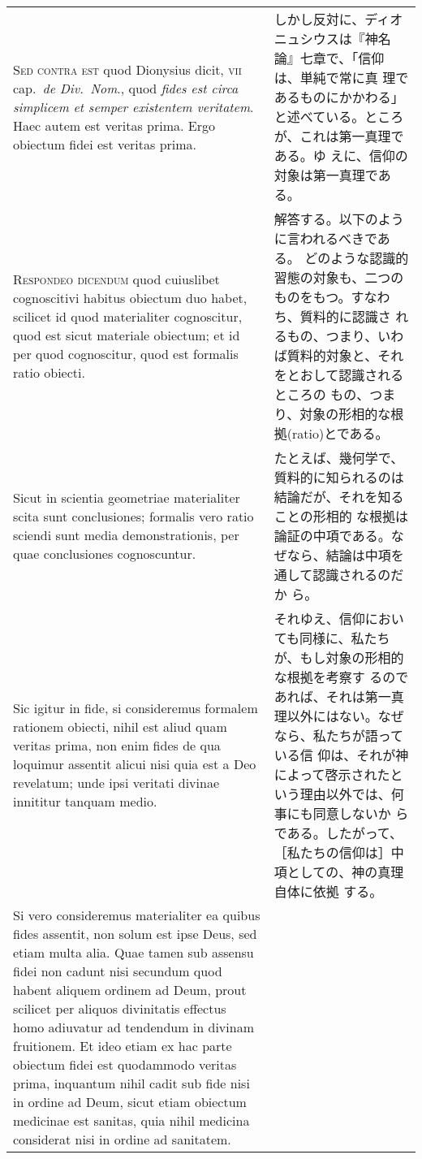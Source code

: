 \documentclass[10pt]{jsarticle} %
\begin{document}
\begin{longtable}{p{21em}p{21em}}
{\scshape Sed contra est} quod Dionysius dicit, {\scshape vii} cap.~{\itshape de
Div.~Nom}., quod {\itshape fides est circa simplicem et semper
existentem veritatem}. Haec autem est veritas prima. Ergo obiectum fidei
est veritas prima.


&

しかし反対に、ディオニュシウスは『神名論』七章で、「信仰は、単純で常に真
理であるものにかかわる」と述べている。ところが、これは第一真理である。ゆ
えに、信仰の対象は第一真理である。

\\

{\scshape Respondeo dicendum} quod cuiuslibet
cognoscitivi habitus obiectum duo habet, scilicet id quod materialiter
cognoscitur, quod est sicut materiale obiectum; et id per quod
cognoscitur, quod est formalis ratio obiecti. 


&

解答する。以下のように言われるべきである。
どのような認識的習態の対象も、二つのものをもつ。すなわち、質料的に認識さ
 れるもの、つまり、いわば質料的対象と、それをとおして認識されるところの
 もの、つまり、対象の形相的な根拠(ratio)とである。

\\

Sicut in scientia
geometriae materialiter scita sunt conclusiones; formalis vero ratio
sciendi sunt media demonstrationis, per quae conclusiones
cognoscuntur. 

&

たとえば、幾何学で、質料的に知られるのは結論だが、それを知ることの形相的
な根拠は論証の中項である。なぜなら、結論は中項を通して認識されるのだか
ら。

\\

Sic igitur in fide, si consideremus formalem rationem
obiecti, nihil est aliud quam veritas prima, non enim fides de qua
loquimur assentit alicui nisi quia est a Deo revelatum; unde ipsi
veritati divinae innititur tanquam medio. 


&

それゆえ、信仰においても同様に、私たちが、もし対象の形相的な根拠を考察す
るのであれば、それは第一真理以外にはない。なぜなら、私たちが語っている信
仰は、それが神によって啓示されたという理由以外では、何事にも同意しないか
らである。したがって、［私たちの信仰は］中項としての、神の真理自体に依拠
する。

\\


Si vero consideremus
materialiter ea quibus fides assentit, non solum est ipse Deus, sed
etiam multa alia. Quae tamen sub assensu fidei non cadunt nisi secundum
quod habent aliquem ordinem ad Deum, prout scilicet per aliquos
divinitatis effectus homo adiuvatur ad tendendum in divinam
fruitionem. Et ideo etiam ex hac parte obiectum fidei est quodammodo
veritas prima, inquantum nihil cadit sub fide nisi in ordine ad Deum,
sicut etiam obiectum medicinae est sanitas, quia nihil medicina
considerat nisi in ordine ad sanitatem.


\end{longtable}
\end{document}
